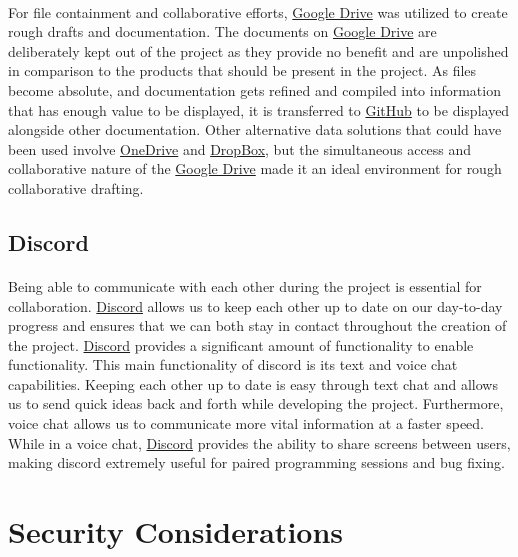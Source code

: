 \documentclass[12pt]{article}
\begin{document}
\paragraph{}	For file containment and collaborative efforts, \href{https://drive.google.com}{Google Drive} was utilized to create rough drafts and documentation. The documents on \href{https://drive.google.com}{Google Drive} are deliberately kept out of the project as they provide no benefit and are unpolished in comparison to the products that should be present in the project. As files become absolute, and documentation gets refined and compiled into information that has enough value to be displayed, it is transferred to \href{https://github.com}{GitHub} to be displayed alongside other documentation. Other alternative data solutions that could have been used involve \href{https://onedrive.live.com/}{OneDrive} and \href{https://dropbox.com}{DropBox}, but the simultaneous access and collaborative nature of the \href{https://drive.google.com}{Google Drive} made it an ideal environment for rough collaborative drafting. 

\subsection{Discord}
\paragraph{}
	Being able to communicate with each other during the project is essential for collaboration. \href{https://discordapp.com/}{Discord} allows us to keep each other up to date on our day-to-day progress and ensures that we can both stay in contact throughout the creation of the project. \href{https://discordapp.com/}{Discord} provides a significant amount of functionality to enable functionality. This main functionality of discord is its text and voice chat capabilities. Keeping each other up to date is easy through text chat and allows us to send quick ideas back and forth while developing the project. Furthermore, voice chat allows us to communicate more vital information at a faster speed. While in a voice chat, \href{https://discordapp.com/}{Discord} provides the ability to share screens between users, making discord extremely useful for paired programming sessions and bug fixing.

\newpage
\section{Security Considerations}
\end{document}
